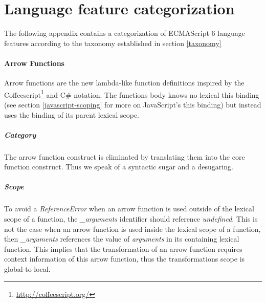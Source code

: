 
\chapter{Language feature categorization} %

\label{AppendixB} %


The following appendix contains a categorization of ECMAScript 6 language features according to the taxonomy established in section \ref{taxonomy}

\subsubsection{Arrow Functions} \label{arrow}
Arrow functions\cite[14.2]{SpecJS} are the new lambda-like function definitions inspired by the Coffeescript\footnote{\url{http://coffeescript.org/}} and C\# notation. The functions body knows no lexical this binding (see section \ref{javascript-scoping} for more on JavaScript's this binding) but instead uses the binding of its parent lexical scope.

\paragraph{Category}
The arrow function construct is eliminated by translating them into the core function construct. Thus we speak of a syntactic sugar and a desugaring.

\paragraph{Scope}
To avoid a \textit{ReferenceError} when an arrow function is used outside of the lexical scope of a function, the \textit{\_arguments} identifier should reference \textit{undefined}. This is not the case when an arrow function is used inside the lexical scope of a function, then \textit{\_arguments} references the value of \textit{arguments} in its containing lexical function. This implies that the transformation of an arrow function requires context information of this arrow function, thus the transformations scope is global-to-local.

